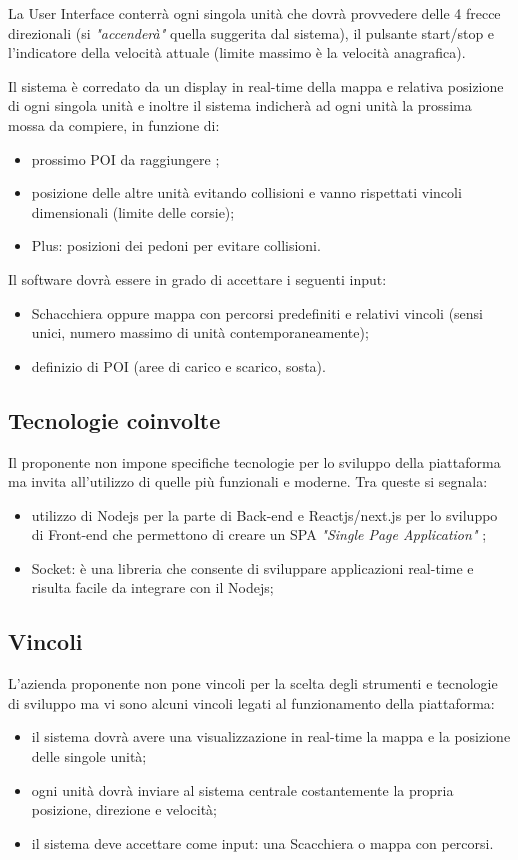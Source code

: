La User Interface conterrà ogni singola unità  che dovrà provvedere delle 4 frecce direzionali (si \textit{"accenderà"} quella suggerita dal sistema), il pulsante start/stop e l'indicatore della velocità attuale (limite massimo è  la velocità anagrafica).

Il sistema è corredato da un display in real-time della mappa e relativa posizione di ogni singola unità e inoltre il sistema indicherà ad ogni unità la prossima mossa da compiere, in funzione di: 
\begin{itemize}
\item prossimo POI da raggiungere ;
\item posizione delle altre unità evitando collisioni e vanno rispettati vincoli dimensionali (limite delle corsie);
\item Plus: posizioni dei pedoni per evitare collisioni.
\end{itemize}
Il software dovrà essere in grado di accettare i seguenti input:\begin{itemize}
\item Schacchiera oppure mappa con percorsi predefiniti e relativi vincoli (sensi unici, numero massimo di unità contemporaneamente);
\item definizio di POI (aree di carico e scarico, sosta).
\end{itemize}





\subsection{Tecnologie coinvolte}
Il proponente non impone specifiche tecnologie per lo sviluppo della piattaforma ma invita all'utilizzo di quelle più funzionali e moderne.
Tra queste si segnala: 
\begin{itemize}
\item utilizzo di Nodejs per la parte di Back-end e Reactjs/next.js  per lo sviluppo di Front-end che permettono di creare un SPA \textit{"Single Page Application"} ;
\item Socket: è una libreria che consente di sviluppare applicazioni real-time e risulta facile da integrare con il Nodejs;
\end{itemize}

\subsection{Vincoli}
L'azienda proponente non pone vincoli per la scelta degli strumenti e tecnologie di sviluppo ma vi sono alcuni vincoli legati al funzionamento della piattaforma: 
\begin{itemize}
\item il sistema dovrà avere una visualizzazione in real-time la mappa e la posizione delle singole unità;
\item ogni unità dovrà inviare al sistema centrale costantemente la propria posizione, direzione e velocità;
\item il sistema deve accettare come input: una Scacchiera o mappa con percorsi.
\end{itemize}


